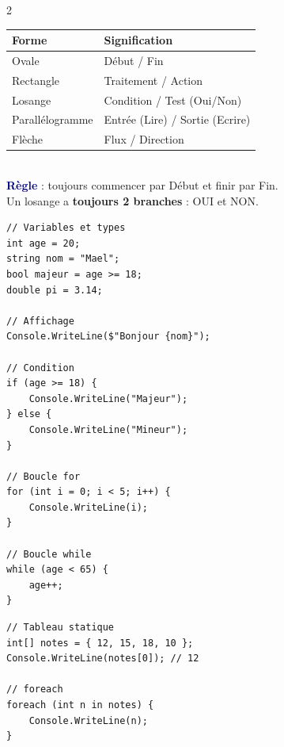 \documentclass[a4paper,10pt]{article}
\newcommand{\key}[1]{\textbf{\textcolor{navy}{#1}}}
\begin{document}
\begin{multicols}{2}
\begin{tcolorbox}[basebox, colframe=orange, title=3. Algorigrammes — Symboles]
\begin{tabular}{ll}
\toprule
\textbf{Forme} & \textbf{Signification} \\
\midrule
Ovale          & Début / Fin \\
Rectangle      & Traitement / Action \\
Losange        & Condition / Test (Oui/Non) \\
Parallélogramme & Entrée (Lire) / Sortie (Ecrire) \\
Flèche         & Flux / Direction \\
\bottomrule
\end{tabular}
\vspace{4pt}\\
\key{Règle} : toujours commencer par Début et finir par Fin.\\
Un losange a \textbf{toujours 2 branches} : OUI et NON.
\end{tcolorbox}

\begin{tcolorbox}[basebox, colframe=green, title=4. C\# — Bases du langage]
\begin{lstlisting}[style=csharp]
// Variables et types
int age = 20;
string nom = "Mael";
bool majeur = age >= 18;
double pi = 3.14;

// Affichage
Console.WriteLine($"Bonjour {nom}");

// Condition
if (age >= 18) {
    Console.WriteLine("Majeur");
} else {
    Console.WriteLine("Mineur");
}

// Boucle for
for (int i = 0; i < 5; i++) {
    Console.WriteLine(i);
}

// Boucle while
while (age < 65) {
    age++;
}
\end{lstlisting}
\end{tcolorbox}

\begin{tcolorbox}[basebox, colframe=green, title=5. C\# — Tableaux et collections]
\begin{lstlisting}[style=csharp]
// Tableau statique
int[] notes = { 12, 15, 18, 10 };
Console.WriteLine(notes[0]); // 12

// foreach
foreach (int n in notes) {
    Console.WriteLine(n);
}


\end{lstlisting}
\end{tcolorbox}
\end{multicols}
\end{document}
